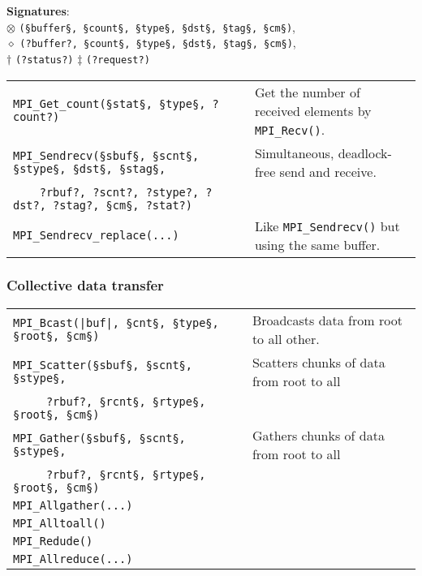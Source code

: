 \documentclass[11pt]{article}
\begin{document}
\textbf{Signatures}: \\
{ \footnotesize
	\hspace{2cm} $\otimes$ \lstinline$(§buffer§, §count§, §type§, §dst§, §tag§, §cm§)$, \\
	\hspace{2cm} $\diamond$ \lstinline$(?buffer?, §count§, §type§, §dst§, §tag§, §cm§)$, \\
	\hspace{2cm} $\dag$ \lstinline$(?status?)$ $\ddag$ \lstinline$(?request?)$
}

\begin{tabular}{ p{8cm} l }
	\lstinline$MPI_Get_count(§stat§, §type§, ?count?)$ & Get the number of received elements by \lstinline$MPI_Recv()$. \\

	\lstinline$MPI_Sendrecv(§sbuf§, §scnt§, §stype§, §dst§, §stag§,$ & Simultaneous, deadlock-free send and receive. \\
	\lstinline$    ?rbuf?, ?scnt?, ?stype?, ?dst?, ?stag?, §cm§, ?stat?)$ & \\

	\lstinline$MPI_Sendrecv_replace(...)$ & Like \lstinline$MPI_Sendrecv()$ but using the same buffer. \\
\end{tabular}

\subsubsection{Collective data transfer}

\begin{tabular}{ p{8cm} l }
	\lstinline$MPI_Bcast(|buf|, §cnt§, §type§, §root§, §cm§)$ & Broadcasts data from root to all other. \\	\lstinline$MPI_Scatter(§sbuf§, §scnt§, §stype§,$ & Scatters chunks of data from root to all \\
	\lstinline$     ?rbuf?, §rcnt§, §rtype§, §root§, §cm§)$ & \\
	\lstinline$MPI_Gather(§sbuf§, §scnt§, §stype§,$ & Gathers chunks of data from root to all \\
	\lstinline$     ?rbuf?, §rcnt§, §rtype§, §root§, §cm§)$ & \\
	\lstinline$MPI_Allgather(...)$ & \\
	\lstinline$MPI_Alltoall()$ & \\
	\lstinline$MPI_Redude()$ & \\
	\lstinline$MPI_Allreduce(...)$ & \\
\end{tabular}
\end{document}
